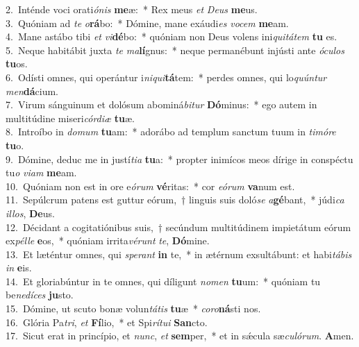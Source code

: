 {2.~}Inténde voci orati\textit{ó}\textit{nis} \textbf{me}æ:~* Rex meus \textit{et} \textit{De}\textit{us} \textbf{me}us.\\
{3.~}Quóniam ad \textit{te} \textit{o}\textbf{rá}bo:~* Dómine, mane exáudi\textit{es} \textit{vo}\textit{cem} \textbf{me}am.\\
{4.~}Mane astábo tibi \textit{et} \textit{vi}\textbf{dé}bo:~* quóniam non Deus volens ini\textit{qui}\textit{tá}\textit{tem} \textbf{tu} es.\\
{5.~}Neque habitábit juxta \textit{te} \textit{ma}\textbf{lí}gnus:~* neque permanébunt injústi ante \textit{ó}\textit{cu}\textit{los} \textbf{tu}os.\\
{6.~}Odísti omnes, qui operántur i\textit{ni}\textit{qui}\textbf{tá}tem:~* perdes omnes, qui lo\textit{quún}\textit{tur} \textit{men}\textbf{dá}cium.\\
{7.~}Virum sánguinum et dolósum abominá\textit{bi}\textit{tur} \textbf{Dó}minus:~* ego autem in multitúdine miseri\textit{cór}\textit{di}\textit{æ} \textbf{tu}æ.\\
{8.~}Introíbo in \textit{do}\textit{mum} \textbf{tu}am:~* adorábo ad templum sanctum tuum in \textit{ti}\textit{mó}\textit{re} \textbf{tu}o.\\
{9.~}Dómine, deduc me in justí\textit{ti}\textit{a} \textbf{tu}a:~* propter inimícos meos dírige in conspéctu tu\textit{o} \textit{vi}\textit{am} \textbf{me}am.\\
{10.~}Quóniam non est in ore e\textit{ó}\textit{rum} \textbf{vé}ritas:~* cor \textit{e}\textit{ó}\textit{rum} \textbf{va}num est.\\
{11.~}Sepúlcrum patens est guttur eórum,~† linguis suis doló\textit{se} \textit{a}\textbf{gé}bant,~* júdi\textit{ca} \textit{il}\textit{los}, \textbf{De}us.\\
{12.~}Décidant a cogitatiónibus suis,~† secúndum multitúdinem impietátum eórum ex\textit{pél}\textit{le} \textbf{e}os,~* quóniam irrita\textit{vé}\textit{runt} \textit{te}, \textbf{Dó}mine.\\
{13.~}Et læténtur omnes, qui \textit{spe}\textit{rant} \textbf{in} te,~* in ætérnum exsultábunt: et habi\textit{tá}\textit{bis} \textit{in} \textbf{e}is.\\
{14.~}Et gloriabúntur in te omnes, qui díligunt \textit{no}\textit{men} \textbf{tu}um:~* quóniam tu be\textit{ne}\textit{dí}\textit{ces} \textbf{ju}sto.\\
{15.~}Dómine, ut scuto bonæ volun\textit{tá}\textit{tis} \textbf{tu}æ~* \textit{co}\textit{ro}\textbf{ná}sti nos.\\
{16.~}Glória Pa\textit{tri}, \textit{et} \textbf{Fí}lio,~* et Spi\textit{rí}\textit{tu}\textit{i} \textbf{San}cto.\\
{17.~}Sicut erat in princípio, et \textit{nunc}, \textit{et} \textbf{sem}per,~* et in sǽcula sæ\textit{cu}\textit{ló}\textit{rum}. \textbf{A}men.\\
